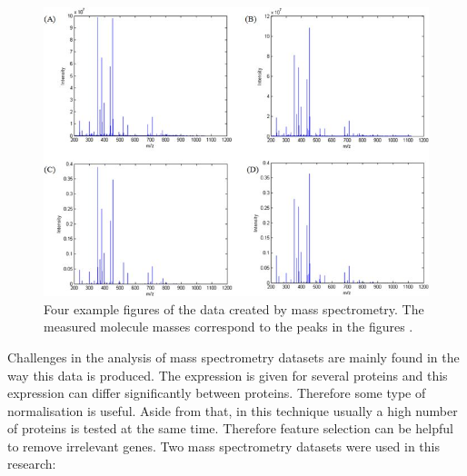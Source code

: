 \documentclass[10pt,a4paper]{report}
\begin{document}
	\begin{figure}
		\includegraphics[width=\textwidth]{MassSpect.jpg}
		\caption{Four example figures of the data created by mass spectrometry. The measured molecule masses correspond to the peaks in the figures \cite{neves2018mass}.}
		\label{fig:MassSpect}
	\end{figure}
	
	
	Challenges in the analysis of mass spectrometry datasets are mainly found in the way this data is produced. The expression is given for several proteins and this expression can differ significantly between proteins. Therefore some type of normalisation is useful. Aside from that, in this technique usually a high number of proteins is tested at the same time. Therefore feature selection can be helpful to remove irrelevant genes. Two mass spectrometry datasets were used in this research:
	
\end{document}
